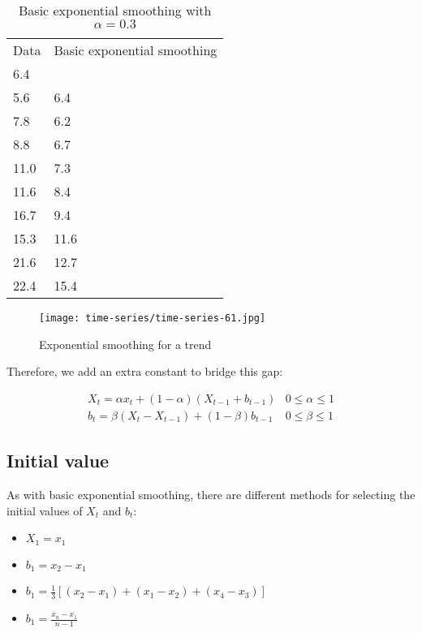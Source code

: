 \begin{table}
  \centering
    \begin{tabular}{|ll|}
    \hline
    Data & Basic exponential smoothing \\
    6.4  & ~                      \\
    5.6  & 6.4                    \\
    7.8  & 6.2                    \\
    8.8  & 6.7                    \\
    11.0 & 7.3                    \\
    11.6 & 8.4                    \\
    16.7 & 9.4                    \\
    15.3 & 11.6                   \\
    21.6 & 12.7                   \\
    22.4 & 15.4                   \\ \hline
    \end{tabular}
    \caption{Basic exponential smoothing with $\alpha = 0.3$}
    \label{tab:trend}
\end{table}
  
\begin{figure}
  \centering
  \texttt{[image: time-series/time-series-61.jpg]}
  \caption{Exponential smoothing for a trend}
  \label{fig:time-series-61}
\end{figure}

Therefore, we add an extra constant to bridge this gap:

\begin{definition}
\begin{eqnarray}
  X_{t} = \alpha x_{t} + (1-\alpha)(X_{t-1} + b_{t-1}) & 0 \leq \alpha \leq 1 \\
  b_{t} = \beta(X_{t}-X_{t-1}) + (1-\beta)b_{t-1} & 0 \leq \beta \leq 1 
\label{eq:doubleSmoothing}
\end{eqnarray}
\end{definition}

\subsection{Initial value}

As with basic exponential smoothing, there are different methods for selecting the initial values of $X_{t}$ and $b_{t}$:

\begin{itemize}
	\item $X_{1} = x_{1}$
	\item $b_{1} = x_{2} - x_{1}$
	\item $b_{1} = \frac{1}{3}\left[ (x_{2} - x_{1}) + (x_{1} - x_{2}) + (x_{4} - x_{3}) \right]$
	\item $b_{1} = \frac{x_{n} - x_{1}}{n-1}$
\end{itemize}

